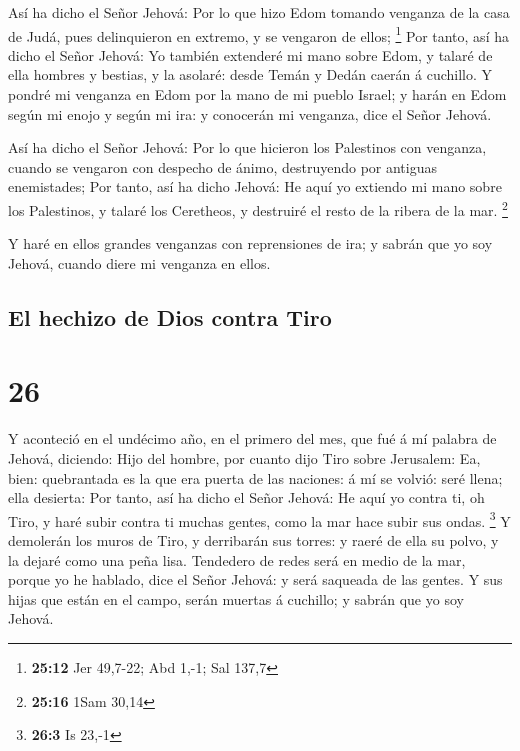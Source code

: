  Así ha dicho el Señor Jehová: Por lo que hizo Edom tomando
venganza de la casa de Judá, pues delinquieron en extremo, y se vengaron
de ellos; \footnote{\textbf{25:12} Jer 49,7-22; Abd 1,-1; Sal 137,7}
 Por tanto, así ha dicho el Señor Jehová: Yo también
extenderé mi mano sobre Edom, y talaré de ella hombres y bestias, y la
asolaré: desde Temán y Dedán caerán á cuchillo.  Y pondré
mi venganza en Edom por la mano de mi pueblo Israel; y harán en Edom
según mi enojo y según mi ira: y conocerán mi venganza, dice el Señor
Jehová.

 Así ha dicho el Señor Jehová: Por lo que hicieron los
Palestinos con venganza, cuando se vengaron con despecho de ánimo,
destruyendo por antiguas enemistades;  Por tanto, así ha
dicho Jehová: He aquí yo extiendo mi mano sobre los Palestinos, y talaré
los Ceretheos, y destruiré el resto de la ribera de la mar. \footnote{\textbf{25:16}
  1Sam 30,14}

 Y haré en ellos grandes venganzas con reprensiones de ira;
y sabrán que yo soy Jehová, cuando diere mi venganza en ellos.

\hypertarget{el-hechizo-de-dios-contra-tiro}{%
\subsection{El hechizo de Dios contra
Tiro}\label{el-hechizo-de-dios-contra-tiro}}

\hypertarget{section-25}{%
\section{26}\label{section-25}}

 Y aconteció en el undécimo año, en el primero del mes, que
fué á mí palabra de Jehová, diciendo:  Hijo del hombre, por
cuanto dijo Tiro sobre Jerusalem: Ea, bien: quebrantada es la que era
puerta de las naciones: á mí se volvió: seré llena; ella desierta:
 Por tanto, así ha dicho el Señor Jehová: He aquí yo contra
ti, oh Tiro, y haré subir contra ti muchas gentes, como la mar hace
subir sus ondas. \footnote{\textbf{26:3} Is 23,-1}  Y
demolerán los muros de Tiro, y derribarán sus torres: y raeré de ella su
polvo, y la dejaré como una peña lisa.  Tendedero de redes
será en medio de la mar, porque yo he hablado, dice el Señor Jehová: y
será saqueada de las gentes.  Y sus hijas que están en el
campo, serán muertas á cuchillo; y sabrán que yo soy Jehová.

